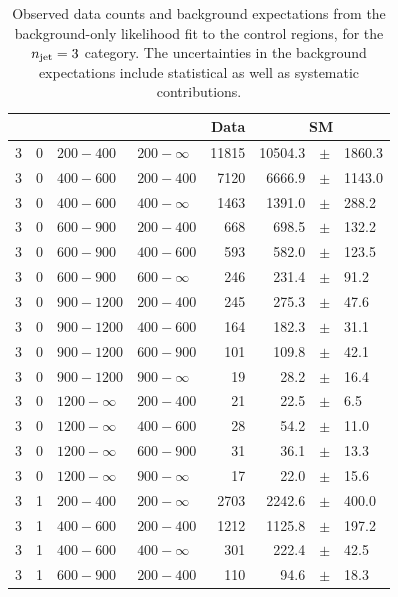\clearpage
\begin{table}[!h]
	\caption{
		Observed data counts and background expectations from the 
		background-only likelihood fit to the control regions, for the 
		$n_{\text{jet}}=3$ category. The uncertainties in the background expectations 
		include statistical as well as systematic contributions. 
	}
	\label{tab:cronly_sr_result-eq3j}
	\scriptsize
	\centering
	\begin{tabular}{rrllrrcl}
		\hline
		\njet\T\B & \nb & \scalht [GeV] & \mht [GeV] & Data & 
		\multicolumn{3}{c}{SM} \\ 
		\hline
		3\T & 0 & $ 200- 400$ & $200-\infty$ &  11815 &  10504.3 &$\pm$& 1860.3 
		\\
		3\T & 0 & $ 400- 600$ & $200-400$ &   7120 &   6666.9 &$\pm$& 1143.0 \\
		3 & 0 & $ 400- 600$ & $400-\infty$ &   1463 &   1391.0 &$\pm$&  288.2 \\
		3\T & 0 & $ 600- 900$ & $200-400$ &    668 &    698.5 &$\pm$&  132.2 \\
		3 & 0 & $ 600- 900$ & $400-600$ &    593 &    582.0 &$\pm$&  123.5 \\
		3 & 0 & $ 600- 900$ & $600-\infty$ &    246 &    231.4 &$\pm$&   91.2 \\
		3\T & 0 & $ 900-1200$ & $200-400$ &    245 &    275.3 &$\pm$&   47.6 \\
		3 & 0 & $ 900-1200$ & $400-600$ &    164 &    182.3 &$\pm$&   31.1 \\
		3 & 0 & $ 900-1200$ & $600-900$ &    101 &    109.8 &$\pm$&   42.1 \\
		3 & 0 & $ 900-1200$ & $900-\infty$ &     19 &     28.2 &$\pm$&   16.4 \\
		3\T & 0 & $1200- \infty$ & $200-400$ &     21 &     22.5 &$\pm$&    6.5 
		\\
		3 & 0 & $1200- \infty$ & $400-600$ &     28 &     54.2 &$\pm$&   11.0 \\
		3 & 0 & $1200- \infty$ & $600-900$ &     31 &     36.1 &$\pm$&   13.3 \\
		3 & 0 & $1200- \infty$ & $900-\infty$ &     17 &     22.0 &$\pm$&   
		15.6 \\
		3\T & 1 & $ 200- 400$ & $200-\infty$ &   2703 &   2242.6 &$\pm$&  400.0 
		\\
		3\T & 1 & $ 400- 600$ & $200-400$ &   1212 &   1125.8 &$\pm$&  197.2 \\
		3 & 1 & $ 400- 600$ & $400-\infty$ &    301 &    222.4 &$\pm$&   42.5 \\
		3\T & 1 & $ 600- 900$ & $200-400$ &    110 &     94.6 &$\pm$&   18.3 \\

\end{tabular}
\end{table}
